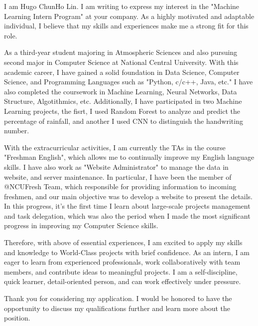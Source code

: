 I am Hugo ChunHo Lin. I am writing to 
express my interest in the "Machine 
Learning Intern Program" at your company.
As a highly motivated and adaptable individual, 
I believe that my skills and experiences 
make me a strong fit for this role.

As a third-year student majoring in Atmospheric 
Sciences and also pursuing second major in 
Computer Science at National Central University.
With this academic career, I have gained a solid
foundation in Data Science, Computer Science, and
Programming Languages such as "Python, c/c++, Java, etc."
I have also completed the coursework in Machine Learning,
Neural Networks, Data Structure, Algotithmics, etc. 
Additionally, I have participated in two Machine 
Learning projects, the fisrt, I used Random Forest 
to analyze and predict the percentage of rainfall,
and another I used CNN to distinguish the handwriting
number.

With the extracurricular activities, I am currently 
the TAs in the course "Freshman English", which 
allows me to continually improve my English language 
skills. I have also work as "Website Administrator" to
manage the data in website, and server maintenance.
In particular, I have been the member of @NCUFresh Team, which
responsible for providing information to incoming freshmen, 
and our main objective was to develop a website to present the details.
In this progress, it's the first time I learn 
about large-scale projects management and task delegation,
which was also the period when I made the most significant 
progress in improving my Computer Science skills.

Therefore, with above of essential experiences, I am excited
to apply my skills and knowledge to World-Class projects
with brief confidence. As an intern, I am eager to learn
from experienced professionals, work collaboratively with 
team members, and contribute ideas to meaningful projects.
I am a self-discipline, quick learner, detail-oriented person, 
and can work effectively under pressure.

Thank you for considering my application. 
I would be honored to have the opportunity 
to discuss my qualifications further and 
learn more about the position.